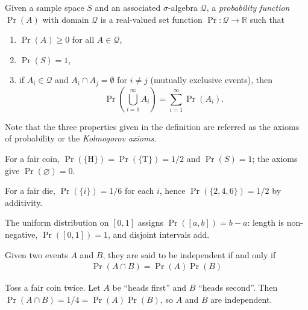 \documentclass[a4paper, 12pt]{book}
\begin{document}
\begin{definition}
      Given a sample space $S$ and an associated $\sigma$-algebra $\mathcal{Q}$, a \emph{probability function} $\Pr(A)$ with domain $\mathcal{Q}$ is a real-valued set function $\Pr: \mathcal{Q} \to \mathbb{R}$ such that
     \begin{enumerate}
         \item $\Pr(A) \geq 0$ for all $A \in \mathcal{Q}$,
         \item $\Pr(S) = 1$,
         \item if $A_i \in \mathcal{Q}$ and $A_i \cap A_j = \emptyset$ for $i \neq j$ (mutually exclusive events), then
         $$\Pr\left(\bigcup_{i=1}^\infty A_i\right) = \sum_{i=1}^\infty \Pr(A_i).$$
     \end{enumerate}
\end{definition}
Note that the three properties given in the definition are referred as the axioms of probability or the \emph{Kolmogorov axioms}. 
\begin{example}
    For a fair coin, $\Pr(\{\mathrm{H}\})=\Pr(\{\mathrm{T}\})=1/2$ and $\Pr(S)=1$; the axioms give $\Pr(\varnothing)=0$.
\end{example}

\begin{example}
    For a fair die, $\Pr(\{i\})=1/6$ for each $i$, hence $\Pr(\{2,4,6\})=1/2$ by additivity.
\end{example}

\begin{example}
    The uniform distribution on $[0,1]$ assigns $\Pr([a,b])=b-a$: length is non-negative, $\Pr([0,1])=1$, and disjoint intervals add.
\end{example}

\begin{definition}
    Given two events $A$ and $B$, they are said to be independent if and only if
    \begin{align}
        \Pr(A \cap B) = \Pr(A)\Pr(B)
    \end{align}
\end{definition}

\begin{example}
    Toss a fair coin twice. Let $A$ be ``heads first'' and $B$ ``heads second''. Then $\Pr(A\cap B)=1/4=\Pr(A)\Pr(B)$, so $A$ and $B$ are independent.
\end{example}
\end{document}
